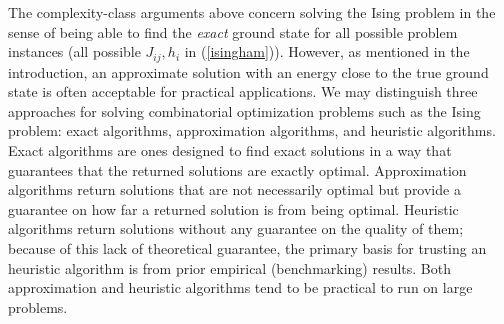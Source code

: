 \documentclass[fleqn,10pt]{wlscirep}
\begin{document}
The complexity-class arguments above concern solving the Ising problem in the sense of being able to find the {\it exact} ground state for all possible problem instances (all possible $J_{ij}, h_i $ in (\ref{isingham})).  However, as mentioned in the introduction, an approximate solution with an energy close to the true ground state is often acceptable for practical applications. 
We may distinguish three approaches for solving combinatorial optimization problems such as the Ising problem: exact algorithms, approximation algorithms, and heuristic algorithms. Exact algorithms are ones designed to find exact solutions in a way that guarantees that the returned solutions are exactly optimal. 
Approximation algorithms return solutions that are not necessarily optimal but provide a guarantee on how far a returned solution is from being optimal. Heuristic algorithms return solutions without any guarantee on the quality of them; because of this lack of theoretical guarantee, the primary basis for trusting an heuristic algorithm is from prior empirical (benchmarking) results. Both approximation and heuristic algorithms tend to be practical to run on large problems.%
\end{document}
